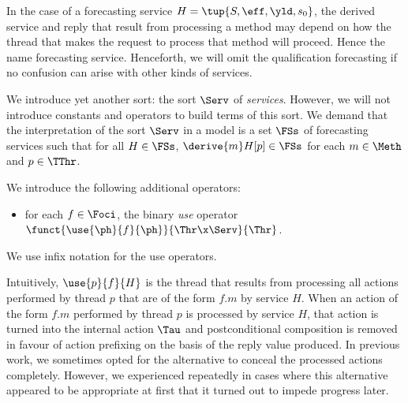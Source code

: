 \documentclass[fleqn]{llncs}
\begin{document}
In the case of a forecasting service $H = \tup{S,\eff,\yld,s_0}$,
the derived service and reply that result from processing a method may
depend on how the thread that makes the request to process that method
will proceed.
Hence the name forecasting service.
Henceforth, we will omit the qualification forecasting if no confusion
can arise with other kinds of services.

We introduce yet another sort: the sort $\Serv$ of \emph{services}.
However, we will not introduce constants and operators to build terms of
this sort.
We demand that the interpretation of the sort $\Serv$ in a model is a
set $\FSs$ of forecasting services such that for all $H \in \FSs$,
$\derive{m}H[p] \in \FSs$ for each $m \in \Meth$ and $p \in \TThr$.

We introduce the following additional operators:
\begin{itemize}
\item
for each $f \in \Foci$, the binary \emph{use} operator
$\funct{\use{\ph}{f}{\ph}}{\Thr \x \Serv}{\Thr}$.
\end{itemize}
We use infix notation for the use operators.

Intuitively, $\use{p}{f}{H}$ is the thread that results from processing
all actions performed by thread $p$ that are of the form $f.m$ by
service $H$.
When an action of the form $f.m$ performed by thread $p$ is processed by
service $H$, that action is turned into the internal action $\Tau$ and
postconditional composition is removed in favour of action prefixing on
the basis of the reply value produced.
In previous work, we sometimes opted for the alternative to conceal the
processed actions completely.
However, we experienced repeatedly in cases where this alternative
appeared to be appropriate at first that it turned out to impede
progress later.
\end{document}
